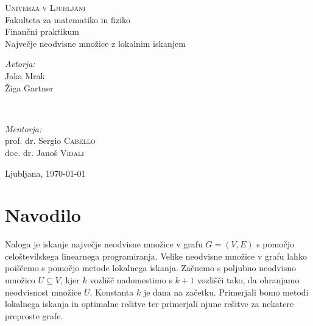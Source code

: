 \documentclass[a4paper, 12pt]{article}
\begin{document}
\begin{titlepage}
    \begin{center}
        \textsc{\LARGE Univerza v Ljubljani}\\[0.5cm]
        {\Large Fakulteta za matematiko in fiziko}\\[3cm]
        {\large Finančni praktikum}\\[0.5cm]
        {\huge Največje neodvisne množice z lokalnim iskanjem}\\[10.0cm]
    \end{center}

    \begin{minipage}{0.4\textwidth}
		\begin{flushleft}
			\large
			\textit{Avtorja:}\\
			Jaka Mrak \\
			Žiga Gartner 
		\end{flushleft}
	\end{minipage}
	~
	\begin{minipage}{0.4\textwidth}
		\begin{flushright}
			\large
			\textit{Mentorja:}\\
			prof. dr. Sergio \textsc{Cabello} \\
			doc. dr. Janoš \textsc{Vidali}
		\end{flushright}
	\end{minipage}
	
	\vfill\vfill\vfill 
	\begin{center}
	{\large{Ljubljana, \today}} 
    \end{center}
	\vfill 

\end{titlepage}

\tableofcontents
\listoffigures

\newpage

\section{Navodilo}

Naloga je iskanje največje neodvisne množice v grafu $G = (V,E)$ s pomočjo celoštevilskega linearnega programiranja. Velike neodvisne množice v grafu lahko poiščemo s pomočjo metode lokalnega iskanja.
Začnemo s poljubno neodvisno množico $U  \subseteq V$, kjer $k$ vozlišč nadomestimo s $k + 1$ vozlišči tako, da ohranjamo neodvisnost množice $U$. Konstanta $k$ je dana na začetku. Primerjali bomo metodi
lokalnega iskanja in optimalne rešitve ter primerjali njune rešitve za nekatere preproste grafe.
\end{document}

